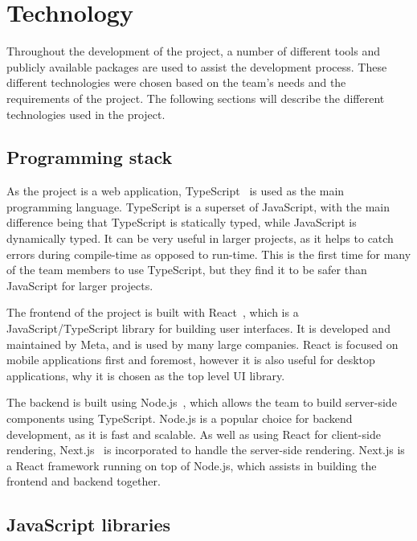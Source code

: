 \section{Technology}\label{sec:technology}

Throughout the development of the project, a number of different tools and publicly available packages are used to
assist the development process.
These different technologies were chosen based on the team's needs and the requirements of the project.
The following sections will describe the different technologies used in the project.

\subsection{Programming stack}\label{subsec:programming}

As the project is a web application, TypeScript~\cite{typescript} is used as the main programming language.
TypeScript is a superset of JavaScript, with the main difference being that TypeScript is statically typed, while
JavaScript is dynamically typed.
It can be very useful in larger projects, as it helps to catch errors during compile-time as opposed to run-time.
This is the first time for many of the team members to use TypeScript, but they find it to be safer than JavaScript
for larger projects.

The frontend of the project is built with React~\cite{react}, which is a JavaScript/TypeScript library for building
user interfaces.
It is developed and maintained by Meta, and is used by many large companies.
React is focused on mobile applications first and foremost, however it is also useful for desktop applications, why it
is chosen as the top level UI library.

The backend is built using Node.js~\cite{node.js}, which allows the team to build server-side components using
TypeScript.
Node.js is a popular choice for backend development, as it is fast and scalable.
As well as using React for client-side rendering, Next.js~\cite{next.js} is incorporated to handle the server-side
rendering.
Next.js is a React framework running on top of Node.js, which assists in building the frontend and backend
together.

\subsection{JavaScript libraries}\label{subsec:libraries}

